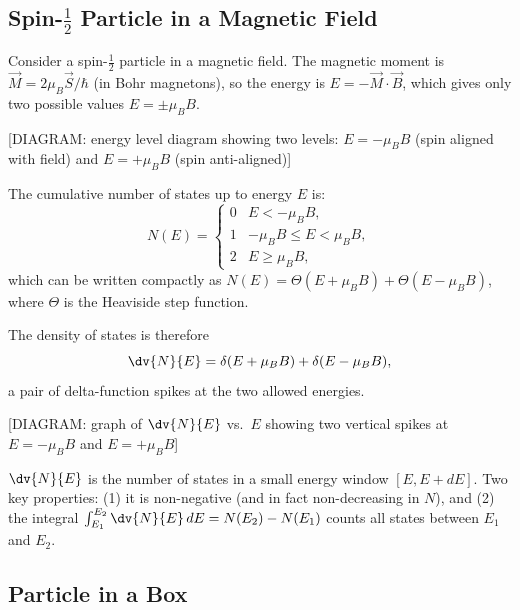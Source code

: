 \subsection{Spin-$\tfrac{1}{2}$ Particle in a Magnetic Field}

Consider a spin-$\tfrac{1}{2}$ particle in a magnetic field. The magnetic moment is $\vec{M} = 2\mu_B \vec{S}/\hbar$ (in Bohr magnetons), so the energy is $E = -\vec{M}\cdot\vec{B}$, which gives only two possible values $E = \pm\mu_B B$.

\begin{center}[DIAGRAM: energy level diagram showing two levels: $E = -\mu_B B$ (spin aligned with field) and $E = +\mu_B B$ (spin anti-aligned)]\end{center}

The cumulative number of states up to energy $E$ is:
\begin{equation}
    N(E) =
    \begin{cases}
        0 & E < -\mu_B B, \\
        1 & -\mu_B B \leq E < \mu_B B, \\
        2 & E \geq \mu_B B,
    \end{cases}
\end{equation}
which can be written compactly as $N(E) = \Theta(E + \mu_B B) + \Theta(E - \mu_B B)$, where $\Theta$ is the Heaviside step function.

The density of states is therefore
\begin{equation}
    \dv{N}{E} = \delta(E + \mu_B B) + \delta(E - \mu_B B),
\end{equation}
a pair of delta-function spikes at the two allowed energies.

\begin{center}[DIAGRAM: graph of $\dv{N}{E}$ vs.\ $E$ showing two vertical spikes at $E = -\mu_B B$ and $E = +\mu_B B$]\end{center}

\begin{definition}
$\dv{N}{E}$ is the number of states in a small energy window $[E, E + dE]$. Two key properties: (1) it is non-negative (and in fact non-decreasing in $N$), and (2) the integral $\int_{E_1}^{E_2}\dv{N}{E}\,dE = N(E_2) - N(E_1)$ counts all states between $E_1$ and $E_2$.
\end{definition}

\subsection{Particle in a Box}

